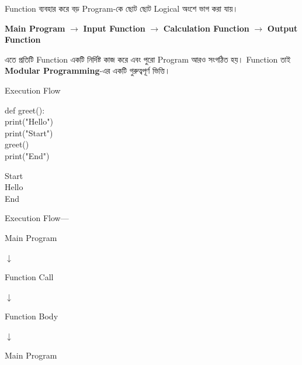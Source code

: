 

Function ব্যবহার করে বড় Program-কে ছোট ছোট Logical অংশে ভাগ করা যায়।

\begin{center}

\textbf{Main Program}
\(\longrightarrow\)
\textbf{Input Function}
\(\longrightarrow\)
\textbf{Calculation Function}
\(\longrightarrow\)
\textbf{Output Function}

\end{center}

এতে প্রতিটি Function একটি নির্দিষ্ট কাজ করে এবং পুরো Program
আরও সংগঠিত হয়। Function তাই \textbf{Modular Programming}-এর
একটি গুরুত্বপূর্ণ ভিত্তি।



\begin{codeoutputbox}{Execution Flow}

\noindent
\begin{minipage}[t]{0.53\linewidth}
\codeheading

\begin{english}
\ttfamily
def greet():\\
\hspace*{4mm}print("Hello")\\[0.5mm]
print("Start")\\
greet()\\
print("End")
\end{english}

\end{minipage}
\hfill
\begin{minipage}[t]{0.43\linewidth}
\outputheading

\begin{english}
\ttfamily
Start\\
Hello\\
End
\end{english}

\medskip

Execution Flow—

\begin{center}

Main Program

\(\downarrow\)

Function Call

\(\downarrow\)

Function Body

\(\downarrow\)

Main Program

\end{center}

\end{minipage}

\end{codeoutputbox}

